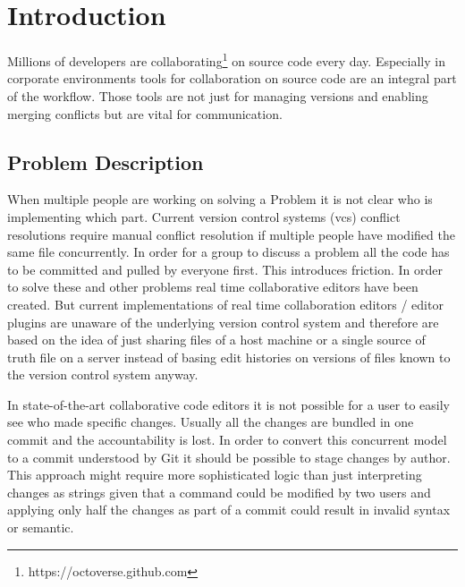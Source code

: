 \chapter{Introduction}
\label{sec:introduction}

Millions of developers are collaborating\footnote{https://octoverse.github.com} on source code every day.
Especially in corporate environments tools for collaboration on source code are an integral part of the workflow.
Those tools are not just for managing versions and enabling merging conflicts but are vital for communication.

\section{Problem Description}

When multiple people are working on solving a Problem it is not clear who is implementing which part. Current version control systems (vcs) conflict resolutions require manual conflict resolution if multiple people have modified the same file concurrently.
In order for a group to discuss a problem all the code has to be committed and pulled by everyone first. This introduces friction. In order to solve these and other problems real time collaborative editors have been created.
But current implementations of real time collaboration editors / editor plugins are unaware of the underlying version control system and therefore are based on the idea of just sharing files of a host machine or a single source of truth file on a server instead of basing edit histories on versions of files known to the version control system anyway.

In state-of-the-art collaborative code editors it is not possible for a user to easily see who made specific changes. Usually all the changes are bundled in one commit and the accountability is lost. In order to convert this concurrent model to a commit understood by Git it should be possible to stage changes by author. This approach might require more sophisticated logic than just interpreting changes as strings given that a command could be modified by two users and applying only half the changes as part of a commit could result in invalid syntax or semantic.

